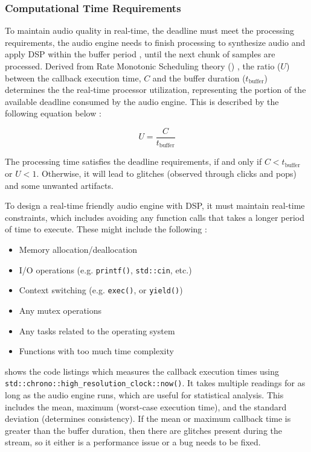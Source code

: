 \subsubsection{Computational Time Requirements}
\label{sec:comp_req}

To maintain audio quality in real-time, the deadline must meet the processing requirements, the audio engine
needs to finish processing to synthesize audio and apply DSP within the buffer period \cite{zhao2024multithreaded}, 
until the next chunk of samples are processed. Derived from Rate Monotonic Scheduling theory () 
\cite{openai_chatgpt}, the ratio ($U$) between the callback execution time, $C$ and the buffer duration ($t_{\text{buffer}}$)
determines the the real-time processor utilization, representing the portion of the available deadline 
consumed by the audio engine. This is described by the following equation below \cite{liu1973scheduling}:

\begin{equation}\label{eq:execution_time}
    U = \frac{C}{t_{\text{buffer}}}
\end{equation}

The processing time satisfies the deadline requirements, if and only if $C < t_{\text{buffer}}$ or $U < 1$.
Otherwise, it will lead to glitches (observed through clicks and pops) and some unwanted artifacts.

To design a real-time friendly audio engine with DSP, it must maintain real-time constraints, which includes
avoiding any function calls that takes a longer period of time to execute. These might include the following \cite{portaudio}:
\begin{itemize}
    \item Memory allocation/deallocation
    \item I/O operations (e.g. \texttt{printf()}, \texttt{std::cin}, etc.)
    \item Context switching (e.g. \texttt{exec()}, or \texttt{yield()})
    \item Any mutex operations
    \item Any tasks related to the operating system
    \item Functions with too much time complexity
\end{itemize}

 shows the code listings which measures the callback execution times using \texttt{std::chrono::high\_resolution\_clock::now()}. 
It takes multiple readings for as long as the audio engine runs, which are useful for statistical analysis. This includes the mean, 
maximum (worst-case execution time), and the standard deviation (determines consistency). If the mean or maximum callback time is greater 
than the buffer duration, then there are glitches present during the stream, so it either is a performance issue or a bug needs to 
be fixed.


